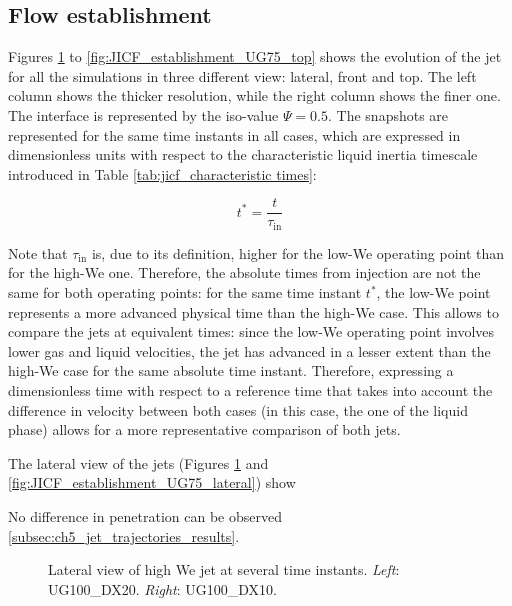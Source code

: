 \subsection{Flow establishment}
\label{subsec:ch5_JICF_flow_establishment}

Figures \ref{fig:JICF_establishment_UG100_lateral} to \ref{fig:JICF_establishment_UG75_top} shows the evolution of the jet for all the simulations in three different view: lateral, front and top. The left column shows the thicker resolution, while the right column shows the finer one. The interface is represented by the iso-value $\Psi = 0.5$. The snapshots are represented for the same time instants in all cases, which are expressed in dimensionless units with respect to the characteristic liquid inertia timescale introduced in Table \ref{tab:jicf_characteristic times}:

\begin{equation}
t^* = \frac{t}{\tau_\mathrm{in}}
\end{equation}

Note that $\tau_\mathrm{in}$ is, due to its definition, higher for the low-We operating point than for the high-We one. Therefore, the absolute times from injection are not the same for both operating points: for the same time instant $t^*$, the low-We point represents a more advanced physical time than the high-We case. This allows to compare the jets at equivalent times: since the low-We operating point involves lower gas and liquid velocities, the jet has advanced in a lesser extent than the high-We case for the same absolute time instant. Therefore, expressing a dimensionless time with respect to a reference time that takes into account the difference in velocity between both cases (in this case, the one of the liquid phase) allows for a more representative comparison of both jets.

The lateral view of the jets (Figures \ref{fig:JICF_establishment_UG100_lateral} and \ref{fig:JICF_establishment_UG75_lateral}) show 

No difference in penetration can be observed \ref{subsec:ch5_jet_trajectories_results}.


\clearpage

\begin{figure}[ht]
\centering
{}
\caption[Lateral view of high We jet at several time instants. ]{Lateral view of high We jet at several time instants. \textsl{Left}: UG100\_DX20. \textsl{Right}: UG100\_DX10.}
\label{fig:JICF_establishment_UG100_lateral}
\end{figure}

